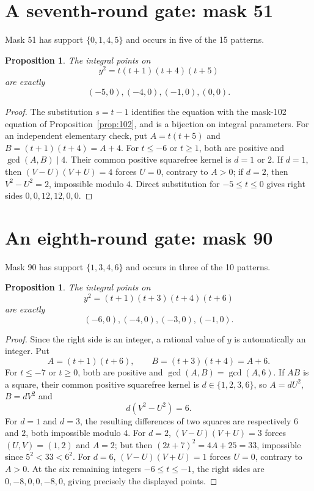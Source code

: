 \documentclass[11pt]{article}
\newtheorem{proposition}[theorem]{Proposition}
\begin{document}
\section{A seventh-round gate: mask 51}
Mask 51 has support $\{0,1,4,5\}$ and occurs in five of the 15 patterns.

\begin{proposition}\label{prop:51}
The integral points on
\[
 y^2=t(t+1)(t+4)(t+5)
\]
are exactly
\[
 (-5,0),(-4,0),(-1,0),(0,0).
\]
\end{proposition}
\begin{proof}
The substitution $s=t-1$ identifies the equation with the mask-102 equation
of Proposition~\ref{prop:102}, and is a bijection on integral parameters.
For an independent elementary check, put $A=t(t+5)$ and
$B=(t+1)(t+4)=A+4$. For $t\leq-6$ or $t\geq1$, both are positive and
$\gcd(A,B)\mid4$. Their common positive squarefree kernel is $d=1$ or
$2$. If $d=1$, then $(V-U)(V+U)=4$ forces $U=0$, contrary to $A>0$;
if $d=2$, then $V^2-U^2=2$, impossible modulo $4$. Direct substitution
for $-5\leq t\leq0$ gives right sides $0,0,12,12,0,0$.
\end{proof}

\section{An eighth-round gate: mask 90}
Mask 90 has support $\{1,3,4,6\}$ and occurs in three of the 10 patterns.

\begin{proposition}\label{prop:90}
The integral points on
\[
 y^2=(t+1)(t+3)(t+4)(t+6)
\]
are exactly
\[
 (-6,0),(-4,0),(-3,0),(-1,0).
\]
\end{proposition}
\begin{proof}
Since the right side is an integer, a rational value of $y$ is automatically
an integer. Put
\[
 A=(t+1)(t+6),\qquad B=(t+3)(t+4)=A+6.
\]
For $t\leq-7$ or $t\geq0$, both are positive and
$\gcd(A,B)=\gcd(A,6)$. If $AB$ is a square, their common positive
squarefree kernel is $d\in\{1,2,3,6\}$, so
$A=dU^2$, $B=dV^2$ and
\[
 d(V^2-U^2)=6.
\]
For $d=1$ and $d=3$, the resulting differences of two squares are respectively
$6$ and $2$, both impossible modulo $4$. For $d=2$,
$(V-U)(V+U)=3$ forces $(U,V)=(1,2)$ and $A=2$; but then
$(2t+7)^2=4A+25=33$, impossible since $5^2<33<6^2$.
For $d=6$, $(V-U)(V+U)=1$ forces $U=0$, contrary to $A>0$.
At the six remaining integers $-6\leq t\leq-1$, the right sides are
$0,-8,0,0,-8,0$, giving precisely the displayed points.
\end{proof}
\end{document}
